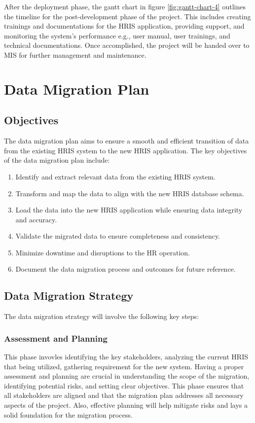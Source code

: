     After the deployment phase, the gantt chart in figure \ref{fig:gantt-chart-4} outlines the timeline for the post-development phase of the project. This includes creating trainings and documentations for the HRIS application, providing support, and monitoring the system's performance e.g., user manual, user trainings, and technical documentations. Once accomplished, the project will be handed over to MIS for further management and maintenance.

\section{Data Migration Plan}

    \subsection{Objectives}

    The data migration plan aims to ensure a smooth and efficient transition of data from the existing HRIS system to the new HRIS application. The key objectives of the data migration plan include:

    \begin{enumerate}
        \item Identify and extract relevant data from the existing HRIS system.
        \item Transform and map the data to align with the new HRIS database schema.
        \item Load the data into the new HRIS application while ensuring data integrity and accuracy.
        \item Validate the migrated data to ensure completeness and consistency.
        \item Minimize downtime and disruptions to the HR operation.
        \item Document the data migration process and outcomes for future reference.
    \end{enumerate}

    \subsection{Data Migration Strategy}

    The data migration strategy will involve the following key steps:
    
        \subsubsection{Assessment and Planning}
            This phase invovles identifying the key stakeholders, analyzing the current HRIS that being utilized, gathering requirement for the new system. Having a proper assessment and planning are crucial in understanding the scope of the migration, identifying potential risks, and setting clear objectives. This phase ensures that all stakeholders are aligned and that the migration plan addresses all necessary aspects of the project. Also, effective planning will help mitigate risks and lays a solid foundation for the migration process.

